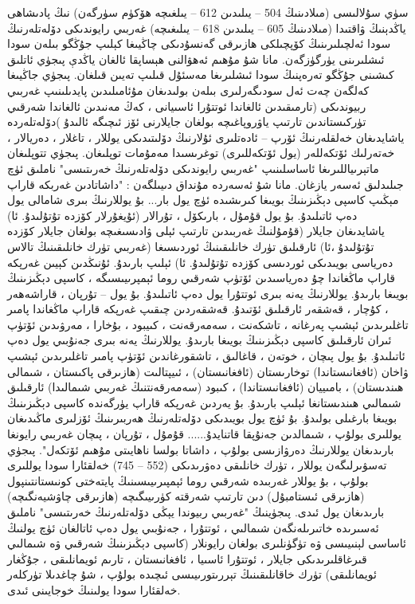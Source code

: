 \documentclass[a4paper]{article}
\begin{document}
\begin{flushright}
سۈي سۇلالىسى (مىلادىنىڭ 504 – يىلىدىن 612 – يىلغىچە ھۆكۈم سۈرگەن) نىڭ پادىشاھى ياڭدېنىڭ ۋاقتىدا (مىلادىنىڭ 605 – يىلىدىن 618 – يىلىغىچە) غەربىي رايوندىكى دۆلەتلەرنىڭ سودا ئەلچىلىرىنىڭ كۆپچىلكى ھازىرقى گەنسۇدىكى چاڭيىغا كېلىپ جۇڭگو بىلەن سودا ئىشلىرىنى يۈرگۈزگەن. مانا شۇ مۇھىم ئەھۋالنى ھېساپقا ئالغان ياڭدې پىجۈي ئاتلىق كىشىنى جۇڭگو تەرەپنىڭ سودا ئىشلىرىغا مەسئۇل قىلىپ تەيىن قىلغان. پىجۈي جاڭيىغا كەلگەن چەت ئەل سودىگەرلىرى بىلەن بولىدىغان مۇئامىلىدىن پايدىلىنىپ غەربىي ربيوندىكى (تارمىقىدىن ئالغاندا ئوتتۇرا ئاسىيانى ، كەڭ مەنىدىن ئالغاندا شەرقىي تۈركىستاندىن تارتىپ ياۋروپاغىچە بولغان جايلارنى ئۆز ئىچىگە ئالىدۇ )دۆلەتلەردە ياشايدىغان خەلقلەرنىڭ ئۆرپ – ئادەتلىرى ئۇلارنىڭ دۆلىتىدىكى يوللار ، تاغلار ، دەريالار ، خەتەرلىك ئۆتكەللەر (يول ئۆتكەللىرى) توغرىسىدا مەمۇمات توپلىغان. پىجۈي تتوپلىغان ماتېرىياللىرىغا ئاساسلىنىپ "غەربىي رايوندىكى دۆلەتلەرنىڭ خەرىتىسى" ناملىق ئۈچ جىلىدلىق ئەسەر يازغان. مانا شۇ ئەسەردە مۇنداق دىيىلگەن : "داشاتادىن غەربكە قاراپ مېڭىپ كاسپى دېڭىزىنىڭ بويىغا كىرىشىدە ئۈچ يول بار... بۇ يوللارنىڭ بىرى شامالى يول دەپ ئاتىلىدۇ. بۇ يول قۇمۇل ، بارىكۆل ، تۇرالار (ئۇيغۇرلار كۆزدە تۇتۇلىدۇ. ئا) ياشايدىغان جايلار (قۇمۇلنىڭ غەربىدىن تارتىپ ئېلى ۋادىسىغىچە بولغان جايلار كۆزدە تۇتۇلىدۇ ،ئا) ئارقىلىق تۈرك خانلىقىنىڭ ئوردىسىغا (غەربىي تۈرك خانلىقىنىڭ تالاس دەرياسى بويىدىكى ئوردىسى كۆزدە تۇتۇلىدۇ. ئا) ئېلىپ بارىدۇ. ئۇنىڭدىن كېيىن غەرپكە قاراپ ماڭغاندا چۇ دەرياسىدىن ئۆتۈپ شەرقىي روما ئېمپرىيىسىگە ، كاسپى دېڭىزىنىڭ بويىغا بارىدۇ. يوللارنىڭ يەنە بىرى ئوتتۇرا يول دەپ ئاتىلىدۇ. بۇ يول – تۇرپان ، قاراشەھەر ، كۇچار ، قەشقەر ئارقىلىق ئۆتىدۇ. قەشقەردىن چىقىپ غەرپكە قاراپ ماڭغاندا پامىر تاغلىرىدىن ئېشىپ پەرغانە ، تاشكەنت ، سەمەرقەنت ، كىيبود ، بۇخارا ، مەرۋىدىن ئۆتۈپ ئىران ئارقىلىق كاسپى دېڭىزىنىڭ بويىغا بارىدۇ. يوللارنىڭ يەنە بىرى جەنۇبىي يول دەپ ئاتىلىدۇ. بۇ يول پىچان ، خوتەن ، قاغالىق ، تاشقورغاندىن ئۆتۈپ پامىر تاغلىرىدىن ئېشىپ ۋاخان (ئافغانىستاندا) توخارىستان (ئافغانىستان) ، ئىيپتالىت (ھازىرقى پاكىستان ، شىمالى ھىندىستان) ، بامىييان (ئافغانىستاندا) ، كىبود (سەمەرقەنتنىڭ غەربىي شىمالىدا) ئارقىلىق شىمالىي ھىندىستانغا ئېلىپ بارىدۇ. بۇ يەردىن غەرپكە قاراپ يۈرگەندە كاسپى دېڭىزىنىڭ بويىغا بارغىلى بولىدۇ. بۇ ئۈچ يول بويىدىكى دۆلەتلەرنىڭ ھەربىرىنىڭ ئۆزلىرى ماڭىدىغان يوللىرى بولۇپ ، شىمالدىن جەنۇپقا قاتنايدۇ...... قۇمۇل ، تۇرپان ، پىچان غەربىي رايونغا بارىدىغان يوللارنىڭ دەرۋازىسى بولۇپ ، داشاتا بولسا ناھايىتى مۇھىم ئۆتكەل". پىجۈي تەسۋىرلىگەن يوللار ، تۈرك خانلىقى دەۋرىدىكى (552 – 745) خەلقئارا سودا يوللىرى بولۇپ ، بۇ يوللار غەربىدە شەرقىي روما ئېمپىرىيىسىنىڭ پايتەختى كونىستانتىنپول (ھازىرقى ئىستامبۇل) دىن تارتىپ شەرقتە كۈرىيىگىچە (ھازىرقى چاۋشيەنگىچە) بارىدىغان يول ئىدى. پىجۈينىڭ "غەربىي ربيوندا يېڭى دۆلەتلەرنىڭ خەرىتىسى" ناملىق ئەسىرىدە خاتىرىلەنگەن شىمالىي ، ئوتتۇرا ، جەنۇبىي يول دەپ ئاتالغان ئۈچ يولنىڭ ئاساسى لېنىيىسى ۋە تۈگۈنلىرى بولغان رايونلار (كاسپى دېڭىزىنىڭ شەرقىي ۋە شىمالىي قىرغاقلىرىدىكى جايلار ، ئوتتۇرا ئاسىيا ، ئافغانىستان ، تارىم ئويمانلىقى ، جۇڭغار ئويمانلىقى) تۈرك خاقانلىقىنىڭ تېررىتورىيىسى ئىچىدە بولۇپ ، شۇ چاغدىلا تۈركلەر خەلقئارا سودا يولىنىڭ خوجايىنى ئىدى.




\end{flushright}
\end{document}
